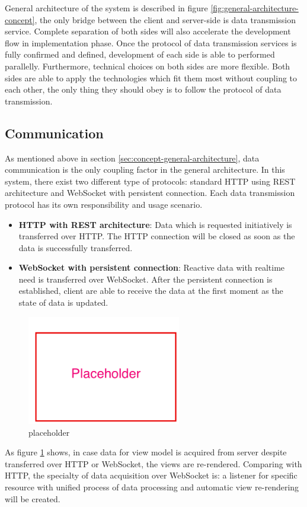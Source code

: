 General architecture of the system is described in figure \ref{fig:general-architecture-concept}, the only bridge between the client and server-side is data transmission service. Complete separation of both sides will also accelerate the development flow in implementation phase. Once the protocol of data transmission services is fully confirmed and defined, development of each side is able to performed parallelly. Furthermore, technical choices on both sides are more flexible. Both sides are able to apply the technologies which fit them most without coupling to each other, the only thing they should obey is to follow the protocol of data transmission.

\subsection{Communication} \label{subsection:concept-general-communication}
As mentioned above in section \ref{sec:concept-general-architecture}, data communication is the only coupling factor in the general architecture. In this system, there exist two different type of protocols: standard HTTP using REST architecture and WebSocket with persistent connection. Each data transmission protocol has its own responsibility and usage scenario.

\begin{itemize}
\item
\textbf{HTTP with REST architecture}: Data which is requested initiatively is transferred over HTTP. The HTTP connection will be closed as soon as the data is successfully transferred.
\item
\textbf{WebSocket with persistent connection}: Reactive data with realtime need is transferred over WebSocket. After the persistent connection is established, client are able to receive the data at the first moment as the state of data is updated. 
\end{itemize}

\begin{figure}[!htbp]
  \centering
    \includegraphics[width=0.6\textwidth]{Figures/placeholder.png}
  \caption{placeholder}
  \label{fig:general-data-communication-concept}
\end{figure}

As figure \ref{fig:general-data-communication-concept} shows, in case data for view model is acquired from server despite transferred over HTTP or WebSocket, the views are re-rendered. Comparing with HTTP, the specialty of data acquisition over WebSocket is: a listener for specific resource with unified process of data processing and automatic view re-rendering will be created.
